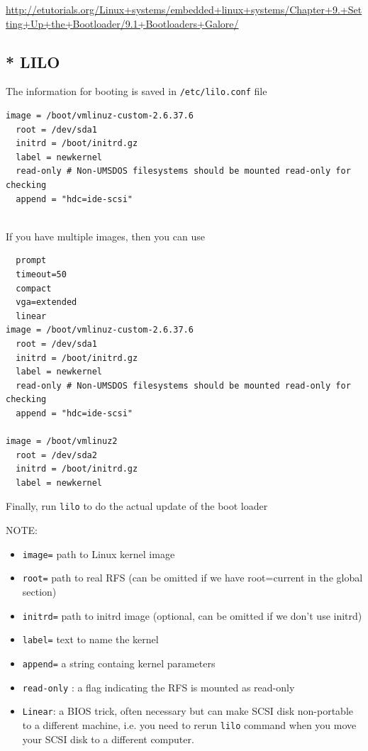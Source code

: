 \url{http://etutorials.org/Linux+systems/embedded+linux+systems/Chapter+9.+Setting+Up+the+Bootloader/9.1+Bootloaders+Galore/}

\subsection{* LILO}
\label{sec:LILO}

The information for booting is saved in \verb!/etc/lilo.conf! file
\begin{verbatim}
image = /boot/vmlinuz-custom-2.6.37.6
  root = /dev/sda1
  initrd = /boot/initrd.gz
  label = newkernel
  read-only # Non-UMSDOS filesystems should be mounted read-only for checking
  append = "hdc=ide-scsi"
  
\end{verbatim}

If you have multiple images, then you can use
\begin{verbatim}
  prompt
  timeout=50 
  compact
  vga=extended
  linear
image = /boot/vmlinuz-custom-2.6.37.6
  root = /dev/sda1
  initrd = /boot/initrd.gz
  label = newkernel
  read-only # Non-UMSDOS filesystems should be mounted read-only for checking
  append = "hdc=ide-scsi"

image = /boot/vmlinuz2
  root = /dev/sda2
  initrd = /boot/initrd.gz
  label = newkernel

\end{verbatim}

Finally, run \verb!lilo! to do the actual update of the boot loader

NOTE:
\begin{itemize}
  \item \verb!image=! path to Linux kernel image
  \item \verb!root=! path to real RFS (can be omitted if we have root=current
  in the global section)
  \item \verb!initrd=! path to initrd image (optional, can be omitted if we
  don't use initrd)
  \item \verb!label=! text to name the kernel
  \item \verb!append=! a string containg kernel parameters
  \item \verb!read-only! : a flag indicating the RFS is mounted as read-only

  \item \verb!Linear!: a BIOS trick, often necessary but can make SCSI disk
  non-portable to a different machine, i.e. you need to rerun \verb!lilo!
  command when you move your SCSI disk to a different computer.
\end{itemize}

